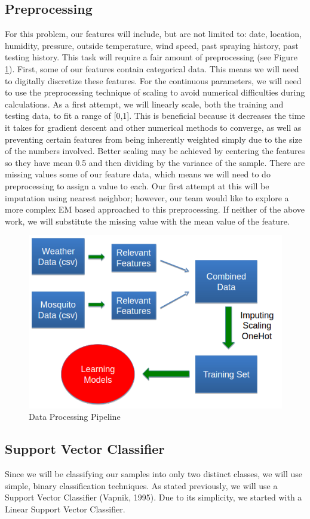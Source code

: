\documentclass{article} %
\begin{document}
\subsection{Preprocessing}
For this problem, our features will include, but are not limited to: date, location, humidity, pressure, outside temperature, wind speed, past spraying history, past testing history.  This task will require a fair amount of preprocessing (see Figure \ref{img:preproc}). First, some of our features contain categorical data. This means we will need to digitally discretize these features. For the continuous parameters, we will need to use the preprocessing technique of scaling to avoid numerical difficulties during calculations. As a first attempt, we will linearly scale, both the training and testing data, to fit a range of [0,1]. This is beneficial because it decreases the time it takes for gradient descent and other numerical methods to converge, as well as preventing certain features from being inherently weighted simply due to the size of the numbers involved. Better scaling may be achieved by centering the features so they have mean 0.5 and then dividing by the variance of the sample. There are missing values some of our feature data, which means we will need to do preprocessing to assign a value to each. Our first attempt at this will be imputation using nearest neighbor; however, our team would like to explore a more complex EM based approached to this preprocessing. If neither of the above work, we will substitute the missing value with the mean value of the feature. 

\begin{figure}
\centering
\includegraphics[width=0.8\linewidth]{"./img/process"}
\caption{Data Processing Pipeline}
\label{img:preproc}
\end{figure}

\subsection{Support Vector Classifier}
Since we will be classifying our samples into only two distinct classes, we will use simple, binary classification techniques. As stated previously, we will use a Support Vector Classifier (Vapnik, 1995). Due to its simplicity, we started with a Linear Support Vector Classifier.
\end{document}
